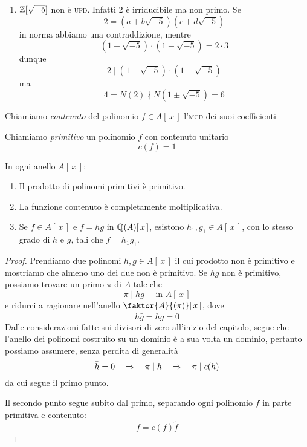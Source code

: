 \begin{multicols}{2}
\begin{enumerate}
	\item $ \mathbb{Z}[\sqrt{-5}] $ non è \textsc{ufd}. Infatti $ 2 $ è irriducibile ma non primo.
	Se \[ 2 = (a+b\sqrt{-5})(c + d\sqrt{-5}) \] in norma abbiamo una contraddizione, mentre
	\[ (1 + \sqrt{-5})\cdot (1 - \sqrt{-5}) = 2 \cdot 3 \]
	dunque \[ 2 \mid (1 + \sqrt{-5})\cdot (1 - \sqrt{-5})  \] ma
	\[ 4 = N(2) \nmid N(1 \pm \sqrt{-5}) = 6 \]
	
\end{enumerate}

\begin{definition}
	Chiamiamo \emph{contenuto} del polinomio $ f \in A[\,x\,] $ l'\textsc{mcd} dei suoi coefficienti
\end{definition}

\begin{definition}
	Chiamiamo \emph{primitivo} un polinomio $ f $ con contenuto unitario
	\[ c(f) = 1 \]
\end{definition}
\begin{theorem}\label{LemmaGauss}
	In ogni anello $ A[\,x\,] $:
	\begin{enumerate}
	\item Il prodotto di polinomi primitivi è primitivo.
	\item La funzione contenuto è completamente moltiplicativa.
	\item Se $ f \in A[\,x\,] $ e $ f = hg $ in $ \mathbb{Q}(A)[\,x\,] $, esistono $ h_1, g_1 \in A[\,x\,] $, con lo stesso grado di $ h $ e $ g $, tali che $ f = h_1g_1 $.
	\end{enumerate}
	
\end{theorem}
\begin{proof}
	Prendiamo due polinomi $ h, g \in A[\,x\,] $ il cui prodotto non è primitivo e mostriamo che almeno uno dei due non è primitivo. Se $ hg $ non è primitivo, possiamo trovare un primo $ \pi $ di $ A $ tale che
	\[ \pi \mid hg \quad\text{ in } A[\,x\,] \]
	e ridurci a ragionare nell'anello $ \faktor{A}{(\pi)}[\,x\,] $, dove
	\[ \bar{h}\bar{g} = \overline{hg} = 0 \]
	 Dalle considerazioni fatte sui divisori di zero all'inizio del capitolo, segue che l'anello dei polinomi costruito su un dominio è a sua volta un dominio, pertanto possiamo assumere, senza perdita di generalità
	 \[ \bar{h} = 0 \quad\Rightarrow\quad \pi \mid h \quad\Rightarrow\quad \pi \mid c(h) \]
	 da cui segue il primo punto.
	 
	 Il secondo punto segue subito dal primo, separando ogni polinomio $ f $ in parte primitiva e contenuto:
	 \[ f = c(f) \tilde{f} \]
	 

\end{proof}
\end{multicols}

